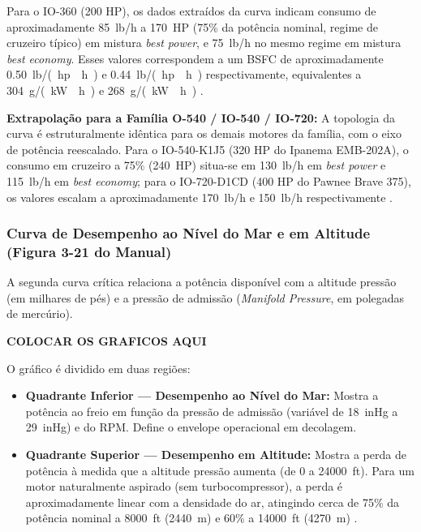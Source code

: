 \documentclass[a4paper,12pt]{article}
\begin{document}
Para o IO-360 (200 HP), os dados extraídos da curva indicam consumo de aproximadamente \SI{85}{lb/h} a \SI{170}{HP} (75\% da potência nominal, regime de cruzeiro típico) em mistura \textit{best power}, e \SI{75}{lb/h} no mesmo regime em mistura \textit{best economy}. Esses valores correspondem a um BSFC de aproximadamente \SI{0.50}{lb/(hp \cdot h)} e \SI{0.44}{lb/(hp \cdot h)} respectivamente, equivalentes a \SI{304}{g/(kW \cdot h)} e \SI{268}{g/(kW \cdot h)} \cite{io360manual}.

\textbf{Extrapolação para a Família O-540 / IO-540 / IO-720:} A topologia da curva é estruturalmente idêntica para os demais motores da família, com o eixo de potência reescalado. Para o IO-540-K1J5 (320 HP do Ipanema EMB-202A), o consumo em cruzeiro a 75\% (\SI{240}{HP}) situa-se em \SI{130}{lb/h} em \textit{best power} e \SI{115}{lb/h} em \textit{best economy}; para o IO-720-D1CD (400 HP do Pawnee Brave 375), os valores escalam a aproximadamente \SI{170}{lb/h} e \SI{150}{lb/h} respectivamente \cite{lycomingmanual, lycoming_io720}.

\subsubsection{Curva de Desempenho ao Nível do Mar e em Altitude (Figura 3-21 do Manual)}

A segunda curva crítica relaciona a potência disponível com a altitude pressão (em milhares de pés) e a pressão de admissão (\textit{Manifold Pressure}, em polegadas de mercúrio). 

\textbf{COLOCAR OS GRAFICOS AQUI}

O gráfico é dividido em duas regiões:

\begin{itemize}
    \item \textbf{Quadrante Inferior --- Desempenho ao Nível do Mar:} Mostra a potência ao freio em função da pressão de admissão (variável de \SI{18}{inHg} a \SI{29}{inHg}) e do RPM. Define o envelope operacional em decolagem.
    \item \textbf{Quadrante Superior --- Desempenho em Altitude:} Mostra a perda de potência à medida que a altitude pressão aumenta (de 0 a \SI{24000}{ft}). Para um motor naturalmente aspirado (sem turbocompressor), a perda é aproximadamente linear com a densidade do ar, atingindo cerca de 75\% da potência nominal a \SI{8000}{ft} (\SI{2440}{m}) e 60\% a \SI{14000}{ft} (\SI{4270}{m}) \cite{io360manual}.
\end{itemize}
\end{document}

